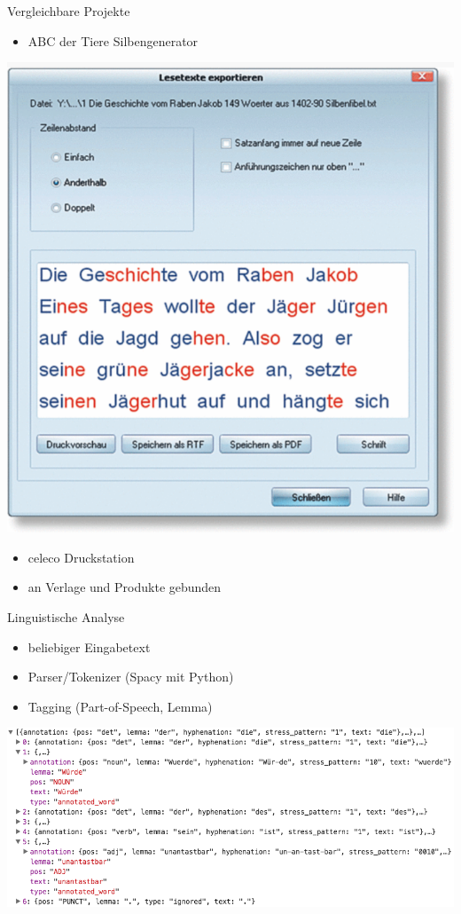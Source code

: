 \documentclass{beamer}
\begin{document}
\begin{frame}{Vergleichbare Projekte}
\begin{itemize}
	\item ABC der Tiere Silbengenerator
\end{itemize}

\centering
\includegraphics[height=0.6\textheight]{../figures/ABCsilbengenerator}

\begin{itemize}
	\item celeco Druckstation
	\item an Verlage und Produkte gebunden
\end{itemize}
\end{frame}

\begin{frame}{Linguistische Analyse}
\begin{itemize}
	\item beliebiger Eingabetext
	\item Parser/Tokenizer (Spacy mit Python)
	\item Tagging (Part-of-Speech, Lemma)
\end{itemize}
\vfill
\includegraphics[height=0.5\textheight]{../figures/json}
\end{frame}
\end{document}
